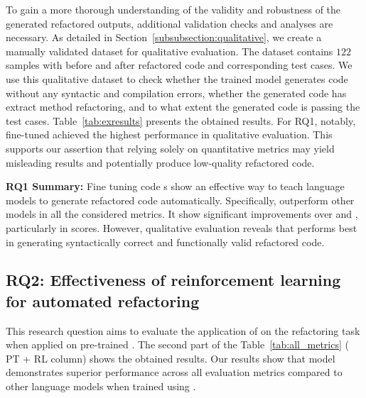 To gain a more thorough understanding of the validity and robustness of the generated refactored outputs, additional validation checks and analyses are necessary. As detailed in Section~\ref{subsubsection:qualitative}, we
create a manually validated dataset for qualitative evaluation.
The dataset contains $122$ samples with before and after refactored code and corresponding test cases.
We use this qualitative dataset to check whether the trained model generates code without any syntactic and compilation errors, whether the generated code has extract method refactoring, and to what extent the generated code is passing the test cases.
Table~\ref{tab:exresults} presents the obtained results. 
For RQ1, notably, fine-tuned \codetf{} achieved the highest performance in qualitative evaluation. This supports our assertion that relying solely on quantitative metrics may yield misleading results and potentially produce low-quality refactored code.


\begin{boxH}
\textbf{RQ1 Summary:}
Fine tuning code \llm{}s show  an effective way to teach language models to generate refactored code automatically. Specifically, \plbart{} outperform other models in all the considered metrics. It show significant improvements over \codetf{} and \codegpt{}, particularly in \codebleu{} scores. 
However, qualitative evaluation reveals that \codetf{} performs best in generating syntactically correct and functionally valid refactored code. 
\end{boxH}


\subsection{RQ2: Effectiveness of reinforcement learning for automated refactoring}

This research question aims to evaluate the application of \rl{} on the refactoring task when applied on pre-trained \llmsc{}.
The second part of the Table~\ref{tab:all_metrics} (\ie{} PT + RL column) shows
the obtained results.
Our results show that \codetf{} model demonstrates superior performance across all evaluation metrics compared to other language models when trained using \rl{}.

